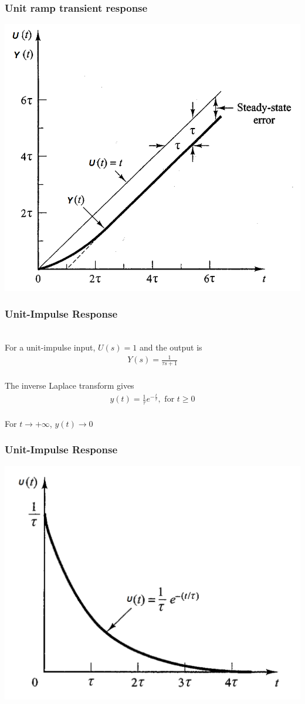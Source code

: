 \begin{frame}
\frametitle{Unit ramp transient response}
\includegraphics[width=0.6\linewidth]{Afbeelding4}
\end{frame}

\begin{frame}
\frametitle{Unit-Impulse Response}

\\ For a unit-impulse input, $U(s)=1$ and the output is
\vspace{0.15cm}
\\ 
\begin{align*}
Y(s)=\frac{1}{\tau s +1}
\end{align*}
\vspace{0.15cm}
\pause
\\ The inverse Laplace transform gives
\vspace{0.15cm}
\\
\begin{align*}
y(t)= \frac{1}{\tau}e^{-\frac{t}{\tau}} ,\text{ for } t \ge 0
\end{align*}
\vspace{0.15cm}
\pause
\\ For $t\rightarrow +\infty$, $y(t)\rightarrow 0$
\end{frame}

\begin{frame}
\frametitle{Unit-Impulse Response}
\includegraphics[width=0.8\linewidth]{Afbeelding5}
\end{frame}

